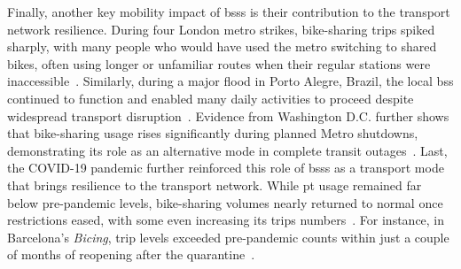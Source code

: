 Finally, another key mobility impact of \acp{bss} is their contribution to the transport network resilience. During four London metro strikes, bike-sharing trips spiked sharply, with many people who would have used the metro switching to shared bikes, often using longer or unfamiliar routes when their regular stations were inaccessible~\cite{Yang2022}. Similarly, during a major flood in Porto Alegre, Brazil, the local \ac{bss} continued to function and enabled many daily activities to proceed despite widespread transport disruption~\cite{Araujo2025}. Evidence from Washington D.C. further shows that bike-sharing usage rises significantly during planned Metro shutdowns, demonstrating its role as an alternative mode in complete transit outages~\cite{Cheng2022}. Last, the COVID-19 pandemic further reinforced this role of \acp{bss} as a transport mode that brings resilience to the transport network. While \ac{pt} usage remained far below pre-pandemic levels, bike-sharing volumes nearly returned to normal once restrictions eased, with some even increasing its trips numbers~\cite{Teixeira2024}. For instance, in Barcelona's \textit{Bicing}, trip levels exceeded pre-pandemic counts within just a couple of months of reopening after the quarantine~\cite{Grau-Escolano2024}.